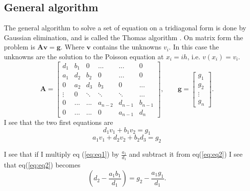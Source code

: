 \documentclass[12pt]{article}
\begin{document}
 \subsection{General algorithm}
 The general algorithm to solve a set of equation on a tridiagonal form is done by Gaussian elimination, and is called the Thomas algorithm \cite{thomas}.  On matrix form the problem is $\mathbf{A}\mathbf{v}=\mathbf{g}$. Where $\mathbf{v}$ contains the unknowns $v_i$. In this case the unknowns are the solution to the Poisson equation at $x_i=ih$, i.e. $v(x_i)=v_i$.
 $$
 \mathbf{A}=  \begin{bmatrix}
  d_1 & b_1 & 0 & \dots & ... & 0 \\
  a_1 &d_2 & b_2 & 0 & ... & 0 \\
  0  & a_2 & d_3 & b_3 & 0 & ... \\
  \vdots & 0 & \ddots & \ddots & \ddots & ...\\
  0 & ... & ... & a_{n-2} & d_{n-1} & b_{n-1}\\
  0 & ... & ... & 0 & a_{n-1} & d_{n} 
 \end{bmatrix}, \qquad \mathbf{g}=\begin{bmatrix}
  g_1 \\ g_2 \\ \vdots \\ g_n
 \end{bmatrix}.
 $$
I see that the two first equations are 
\begin{equation}
  d_1v_1+b_1v_2=g_1
  \label{eq:eq1}
\end{equation}
\begin{equation}
  a_1v_1+d_2v_2+b_2d_3=g_2
  \label{eq:eq2}
\end{equation}

I see that if I multiply eq (\ref{eq:eq1}) by $\frac{a_1}{d_1}$ and subtract it from eq(\ref{eq:eq2}) I see that eq(\ref{eq:eq2}) becomes $$ (d_2-\frac{a_1b_1}{d_1})=g_2-\frac{a_1g_1}{d_1}. $$
\end{document}
